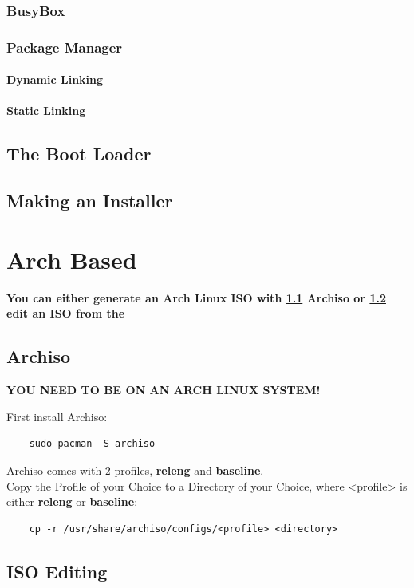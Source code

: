 \documentclass{article}
\begin{document}
		\subsubsection{BusyBox}
		\subsubsection{Package Manager}
		\paragraph{Dynamic Linking}
		\paragraph{Static Linking}
		\subsection{The Boot Loader}
		\subsection{Making an Installer}
\section{Arch Based}
\textbf{You can either generate an Arch Linux ISO with \ref{Archiso} Archiso or \ref{ArchIsoEdit} edit an ISO from the }
\subsection{Archiso}
	\label{Archiso}
	\textbf{YOU NEED TO BE ON AN ARCH LINUX SYSTEM!}

	First install Archiso:
	\begin{lstlisting}
	sudo pacman -S archiso
	\end{lstlisting}
	Archiso comes with 2 profiles, \textbf{releng} and \textbf{baseline}.
	\\
	Copy the Profile of your Choice to a Directory of your Choice, where <profile> is either \textbf{releng} or \textbf{baseline}:
	\begin{lstlisting}
	cp -r /usr/share/archiso/configs/<profile> <directory>
	\end{lstlisting}

\subsection{ISO Editing}
	\label{ArchIsoEdit}
\end{document}

